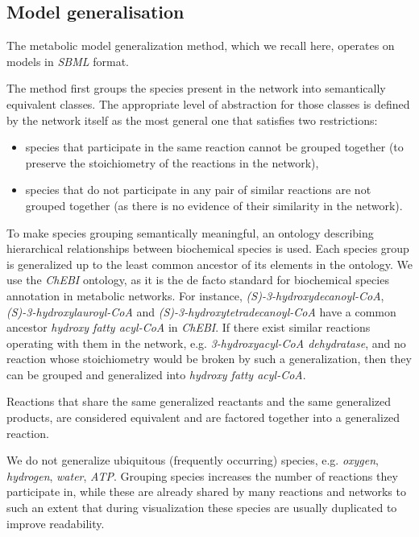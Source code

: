 \documentclass{bmcart}
\begin{document}
\subsection*{Model generalisation}
The metabolic model generalization method\cite{Zhukova2014}, which we recall here, operates on models in \textit{SBML}\cite{Hucka08} format.


The method first groups the species present in the network into semantically equivalent classes. The appropriate level of abstraction for those classes is defined by the network itself as the most general one that satisfies two restrictions: 
\begin{itemize}
 \item species that participate in the same reaction cannot be grouped together (to preserve the stoichiometry of the reactions in the network),
 \item species that do not participate in any pair of similar reactions are not grouped together (as there is no evidence of their similarity in the network).
\end{itemize}
To make species grouping semantically meaningful, an ontology describing hierarchical relationships between biochemical species is used. Each species group is generalized up to the least common ancestor of its elements in the ontology. We use the \textit{ChEBI} ontology, as it is the de facto standard for biochemical species annotation in metabolic networks. %
For instance, \textit{(S)-3-hydroxydecanoyl-CoA}, \textit{(S)-3-hydroxylauroyl-CoA} and \textit{(S)-3-hydroxytetradecanoyl-CoA} have a common ancestor \textit{hydroxy fatty acyl-CoA} in \textit{ChEBI}. If there exist similar reactions operating with them in the network, e.g. \textit{3-hydroxyacyl-CoA dehydratase}, and no reaction whose stoichiometry would be broken by such a generalization, then they can be grouped and generalized into \textit{hydroxy fatty acyl-CoA}.

Reactions that share the same generalized reactants and the same generalized products, are considered equivalent and are factored together into a generalized reaction. 

We do not generalize ubiquitous (frequently occurring) species, e.g. \textit{oxygen}, \textit{hydrogen}, \textit{water}, \textit{ATP}. Grouping species increases the number of reactions they participate in, while these are already shared by many reactions and networks to such an extent that during visualization these species are usually duplicated\cite{Rohn2012} to improve readability.
\end{document}
